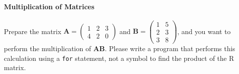 \documentclass{ltjsbook}
\begin{document}
\paragraph{Multiplication of Matrices}
Prepare the matrix $\bm{A} = \begin{pmatrix}1&2&3\\4&2&0\end{pmatrix}$ and $\bm{B}=\begin{pmatrix}1&5\\2&3\\3&8\end{pmatrix}$, and you want to perform the multiplication of $\bm{AB}$.
Please write a program that performs this calculation using a \verb|for| statement, not a symbol to find the product of the R matrix.
\end{document}
